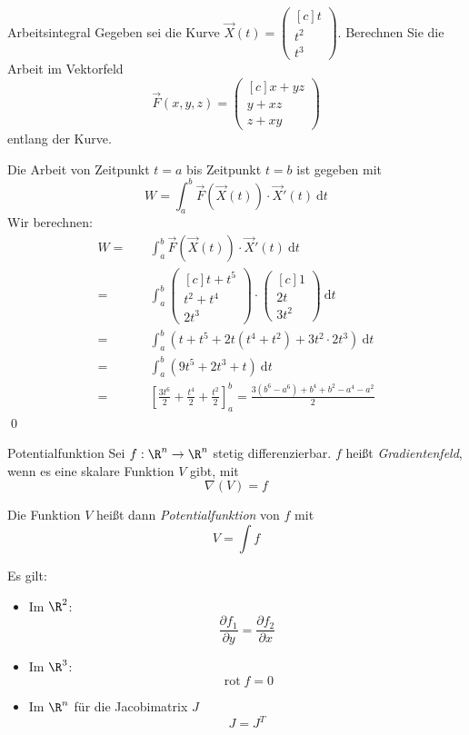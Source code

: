 \documentclass[german]{../spicker}
\newcommand{\vektor}[1]{\begin{pmatrix*}[c] #1 \end{pmatrix*}}
\newcommand{\dt}{~\mathrm{d}t}
\begin{document}
\begin{example}{Arbeitsintegral}
    Gegeben sei die Kurve $\vec{X}(t) = \vektor{t \\ t^2 \\ t^3}$.
    Berechnen Sie die Arbeit im Vektorfeld
    $$
        \vec{F}(x, y, z) = \vektor{x+yz \\ y + xz \\ z + xy}
    $$
    entlang der Kurve.

    \exampleseparator

    Die Arbeit von Zeitpunkt $t=a$ bis Zeitpunkt $t=b$ ist gegeben mit
    $$
        W = \int^b_a \vec{F} (\vec{X}(t)) \cdot \vec{X}'(t) \dt
    $$
    Wir berechnen:
    $$
        \begin{aligned}
            W =\quad & \int^b_a \vec{F} (\vec{X}(t)) \cdot \vec{X}'(t) \dt                                                                    \\
            =\quad   & \int^b_a \vektor{t + t^5                                                                                               \\ t^2 + t^4 \\ 2t^3} \cdot \vektor{1 \\ 2t \\ 3t^2} \dt \\
            =\quad   & \int^b_a \left( t + t^5 + 2t(t^4 + t^2) + 3t^2 \cdot 2t^3\right)  \dt                                                  \\
            =\quad   & \int^b_a \left(9t^5 + 2t^3 + t\right) \dt                                                                              \\
            =\quad   & \left[ \frac{3t^6}{2} + \frac{t^4}{2} + \frac{t^2}{2} \right]^b_a     = \frac{3(b^6 - a^6) + b^4 + b^2 - a^4 - a^2}{2}
        \end{aligned}
    $$\qed
\end{example}

\begin{defi}{Potentialfunktion}
    Sei $f : \R^n \to \R^n$ stetig differenzierbar.
    $f$ heißt \emph{Gradientenfeld}, wenn es eine skalare Funktion $V$ gibt, mit
    $$
        \nabla (V) = f
    $$

    Die Funktion $V$ heißt dann \emph{Potentialfunktion} von $f$ mit
    $$
        V = \int f
    $$

    Es gilt:
    \begin{itemize}
        \item Im $\R^2$:
              $$
                  \frac{\partial f_1}{\partial y} = \frac{\partial f_2}{\partial x}
              $$
        \item Im $\R^3$:
              $$
                  \operatorname{rot} f = 0
              $$
        \item Im $\R^n$ für die Jacobimatrix $J$
              $$
                  J = J^T
              $$
    \end{itemize}
\end{defi}
\end{document}
